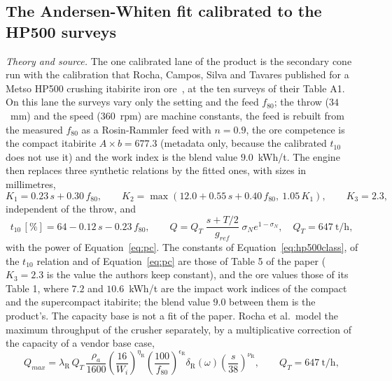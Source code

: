 \subsection{The Andersen-Whiten fit calibrated to the HP500 surveys}\label{sec:m-hp500}

\emph{Theory and source.} The one calibrated lane of the product is the secondary cone run with the calibration that Rocha, Campos, Silva and
Tavares published for a Metso HP500 crushing itabirite iron ore~\cite{rocha2024}, at the ten surveys of their Table A1. On this lane the surveys
vary only the setting and the feed $f_{80}$; the throw ($34$~mm) and the speed ($360$~rpm) are machine constants, the feed is rebuilt from the
measured $f_{80}$ as a Rosin-Rammler feed with $n=0.9$, the ore competence is the compact itabirite $A\times b=677.3$ (metadata only, because the
calibrated $t_{10}$ does not use it) and the work index is the blend value $9.0$~kWh/t. The engine then replaces three synthetic relations by the
fitted ones, with sizes in millimetres,
\begin{equation}
K_1 = 0.23\,s + 0.30\,f_{80},\qquad K_2 = \max\!\left(12.0 + 0.55\,s + 0.40\,f_{80},\ 1.05\,K_1\right),\qquad K_3 = 2.3,
\label{eq:hp500class}
\end{equation}
independent of the throw, and
\begin{equation}
t_{10}\,[\%] = 64 - 0.12\,s - 0.23\,f_{80},\qquad Q = Q_T\;\frac{s+T/2}{g_{ref}}\;\sigma_Ne^{1-\sigma_N},\quad Q_T = 647\ \mathrm{t/h},
\label{eq:hp500t10}
\end{equation}
with the power of Equation~\eqref{eq:pc}. The constants of Equation~\eqref{eq:hp500class}, of the $t_{10}$ relation and of
Equation~\eqref{eq:pc} are those of Table 5 of the paper ($K_3=2.3$ is the value the authors keep constant), and the ore values those of
its Table 1, where $7.2$ and $10.6$~kWh/t are the impact work indices of the compact and the supercompact itabirite; the blend value
$9.0$ between them is the product's. The capacity base is not a fit of the paper. Rocha et al.\ model the maximum throughput of the
crusher separately, by a multiplicative correction of the capacity of a vendor base case,
\begin{equation}
Q_{max} = \lambda_{\mathrm R}\,Q_T\,\frac{\rho_a}{1600}\left(\frac{16}{W_i}\right)^{\eta_{\mathrm R}}\left(\frac{100}{f_{80}}\right)^{\epsilon_{\mathrm R}}\delta_{\mathrm R}(\omega)
\left(\frac{s}{38}\right)^{\nu_{\mathrm R}},\qquad Q_T=647\ \mathrm{t/h},
\label{eq:rocha}
\end{equation}
